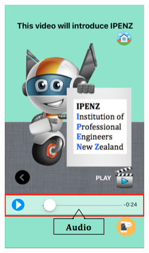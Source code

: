 \begin{figure}[H]
\begin{subfigure}{0.25\textwidth}
\includegraphics[width=\textwidth]{audio2}
\caption{}
 \end{subfigure}\hspace{0.03\textwidth}
 \begin{subfigure}{0.25\textwidth}

\end{subfigure}
\end{figure}
